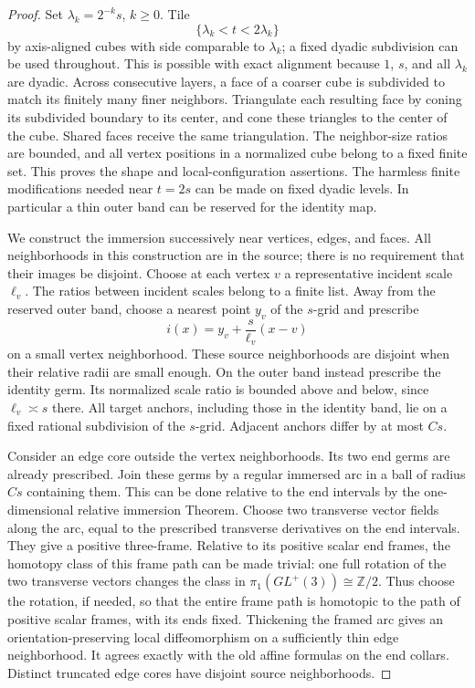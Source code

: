 \documentclass[11pt]{article}
\numberwithin{equation}{section}
\theoremstyle{definition}
\theoremstyle{remark}
\begin{document}
\begin{proof}
Set $\lambda_k=2^{-k}s$, $k\geq0$.  Tile
\[
 \{\lambda_k<t<2\lambda_k\}
\]
by axis-aligned cubes with side comparable to $\lambda_k$; a fixed
dyadic subdivision can be used throughout.  This is possible with
exact alignment because $1$, $s$, and all $\lambda_k$ are dyadic.
Across consecutive layers, a face of a coarser cube is subdivided to
match its finitely many finer neighbors.  Triangulate each resulting
face by coning its subdivided boundary to its center, and cone these
triangles to the center of the cube.  Shared faces receive the same
triangulation.  The neighbor-size ratios are bounded, and all vertex
positions in a normalized cube belong to a fixed finite set.  This
proves the shape and local-configuration assertions.  The harmless
finite modifications needed near $t=2s$ can be made on fixed dyadic
levels.  In particular a thin outer band can be reserved for the
identity map.

We construct the immersion successively near vertices, edges, and
faces.  All neighborhoods in this construction are in the source;
there is no requirement that their images be disjoint.  Choose at each
vertex $v$ a representative incident scale $\ell_v$.  The ratios between
incident scales belong to a finite list.  Away from the reserved outer
band, choose a nearest point $y_v$ of the $s$-grid and prescribe
\[
 i(x)=y_v+\frac{s}{\ell_v}(x-v)
\]
on a small vertex neighborhood.  These source neighborhoods are
disjoint when their relative radii are small enough.  On the outer
band instead prescribe the identity germ.  Its normalized scale ratio
is bounded above and below, since $\ell_v\asymp s$ there.  All target
anchors, including those in the identity band, lie on a fixed rational
subdivision of the $s$-grid.  Adjacent anchors differ by at most $Cs$.

Consider an edge core outside the vertex neighborhoods.  Its two end
germs are already prescribed.  Join these germs by a regular immersed
arc in a ball of radius $Cs$ containing them.  This can be done relative
to the end intervals by the one-dimensional relative immersion
Theorem.  Choose two transverse vector fields along the arc, equal to
the prescribed transverse derivatives on the end intervals.  They
give a positive three-frame.  Relative to its positive scalar end
frames, the homotopy class of this frame path can be made trivial:
one full rotation of the two transverse vectors changes the class in
$\pi_1(GL^+(3))\cong\mathbb Z/2$.  Thus choose the rotation, if needed,
so that the entire frame path is homotopic to the path of positive
scalar frames, with its ends fixed.  Thickening the framed arc gives
an orientation-preserving local diffeomorphism on a sufficiently thin
edge neighborhood.  It agrees exactly with the old affine formulas on
the end collars.  Distinct truncated edge cores have disjoint source
neighborhoods.


\end{proof}
\end{document}
